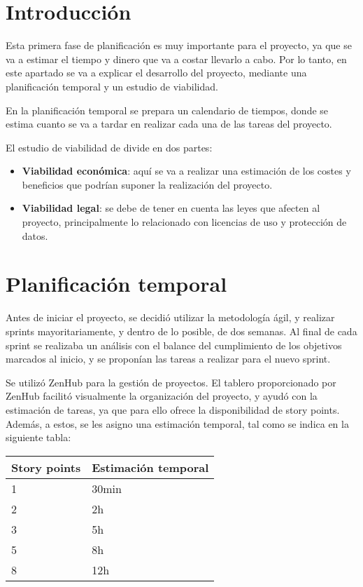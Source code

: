 
\section{Introducción}

Esta primera fase de planificación es muy importante para el proyecto, ya que se va a estimar el tiempo y dinero que va a costar llevarlo a cabo. Por lo tanto, en este apartado se va a explicar el desarrollo del proyecto, mediante una planificación temporal y un estudio de viabilidad.

En la planificación temporal se prepara un calendario de tiempos, donde se estima cuanto se va a tardar en realizar cada una de las tareas del proyecto. 

El estudio de viabilidad de divide en dos partes:

\begin{itemize}
    \item \textbf{Viabilidad económica}: aquí se va a realizar una estimación de los costes y beneficios que podrían suponer la realización del proyecto.
    \item \textbf{Viabilidad legal}: se debe de tener en cuenta las leyes que afecten al proyecto, principalmente lo relacionado con licencias de uso y protección de datos.
\end{itemize}
\newpage
\section{Planificación temporal}
Antes de iniciar el proyecto, se decidió utilizar la metodología ágil, y realizar sprints mayoritariamente, y dentro de lo posible, de dos semanas. Al final de cada sprint se realizaba un análisis con el balance del cumplimiento de los objetivos marcados al inicio, y se proponían las tareas a realizar para el nuevo sprint.

Se utilizó ZenHub para la gestión de proyectos. El tablero proporcionado por ZenHub facilitó visualmente la organización del proyecto, y ayudó con la estimación de tareas, ya que para ello ofrece la disponibilidad de story points. Además, a estos, se les asigno una estimación temporal, tal como se indica en la siguiente tabla:


\begin{table}[H]
	\begin{center}
		\begin{tabular}{ll}
			\hline
			Story points    & Estimación temporal \\ \hline
			1               & 30min      \\
			2               & 2h     \\
			3               & 5h        \\
			5               & 8h       \\
			8               & 12h  \\ \hline
		\end{tabular}
	\end{center}
\end{table}

